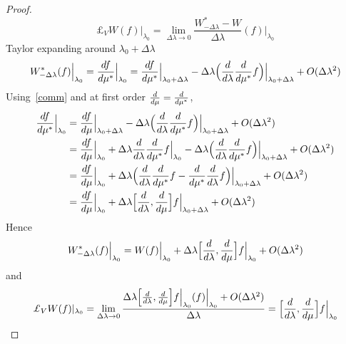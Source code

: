     \begin{proof}
        \begin{equation*}
            \pounds_V W (f) \vert_{\lambda_0} = \lim_{\Delta \lambda \rightarrow 0} \frac{W^*_{-\Delta\lambda} - W}{\Delta \lambda} (f) \Big \vert_{\lambda_0}
        \end{equation*}
        Taylor expanding around $\lambda_0 + \Delta \lambda$ 
        \begin{equation*}
            W^*_{-\Delta\lambda} (f) \Big \vert_{\lambda_0} = \frac{df}{d\mu^*} \Big \vert_{\lambda_0} = \frac{df}{d\mu^*} \Big \vert_{\lambda_0 + \Delta \lambda} - \Delta \lambda \Big ( \frac{d}{d\lambda} \frac{d}{d\mu^*} f \Big)\Big \vert_{\lambda_0 + \Delta \lambda} + O(\Delta \lambda^2)
        \end{equation*}
        Using~\eqref{comm} and at first order $\frac{d}{d\mu} = \frac{d}{d\mu^*}$,
        \begin{equation*}
        \begin{aligned}
            \frac{df}{d\mu^*} \Big \vert_{\lambda_0} & = \frac{df}{d\mu} \Big \vert_{\lambda_0 + \Delta \lambda} - \Delta \lambda \Big ( \frac{d}{d\lambda} \frac{d}{d\mu^*} f \Big)\Big \vert_{\lambda_0 + \Delta \lambda} + O(\Delta \lambda^2) \\ & = \frac{df}{d\mu} \Big \vert_{\lambda_0} + \Delta \lambda \frac{d}{d\lambda} \frac{d}{d\mu^*} f \Big \vert_{\lambda_0} - \Delta \lambda \Big ( \frac{d}{d\lambda} \frac{d}{d\mu^*} f \Big)\Big \vert_{\lambda_0 + \Delta \lambda} + O(\Delta \lambda^2) \\ & = \frac{df}{d\mu} \Big \vert_{\lambda_0} + \Delta \lambda \Big (\frac{d}{d\lambda} \frac{d}{d\mu^*} f -  \frac{d}{d\mu^*} \frac{d}{d\lambda} f \Big) \Big \vert_{\lambda_0 + \Delta \lambda} + O(\Delta \lambda^2) \\ & = \frac{df}{d\mu} \Big \vert_{\lambda_0} + \Delta \lambda \Big [\frac{d}{d\lambda}, \frac{d}{d\mu} \Big ] f \Big \vert_{\lambda_0 + \Delta \lambda} + O(\Delta \lambda^2)  
        \end{aligned}
        \end{equation*}
        Hence
        \begin{equation*}
            W^*_{-\Delta\lambda} (f) \Big \vert_{\lambda_0} = W(f) \Big \vert_{\lambda_0} + \Delta \lambda \Big [\frac{d}{d\lambda}, \frac{d}{d\mu} \Big ] f \Big \vert_{\lambda_0} + O(\Delta \lambda^2) 
        \end{equation*}
        and 
        \begin{equation*}
            \pounds_V W(f) \vert_{\lambda_0} = \lim_{\Delta \lambda \rightarrow 0} \frac{\Delta \lambda \Big [\dv{}{\lambda}, \dv{}{\mu} \Big ] f \Big \vert_{\lambda_0} (f) \Big \vert_{\lambda_0} + O(\Delta \lambda^2) }{\Delta \lambda} = \Big [\dv{}{\lambda}, \dv{}{\mu} \Big ] f \Big \vert_{\lambda_0}
        \end{equation*}
    \end{proof}


